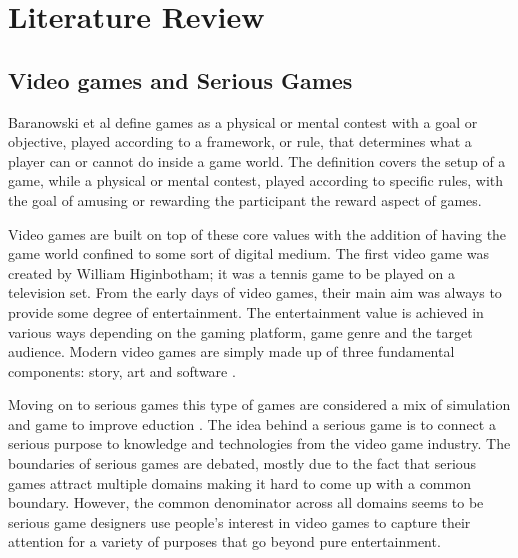 \section{Literature Review}

\subsection{Video games and Serious Games}

Baranowski et al \cite{yuserious} define games as a physical or mental contest with a goal or objective, played according to a framework, or rule, that determines what a player can or cannot do inside a game world. The definition covers the setup of a game, while a physical or mental contest, played according to specific rules, with the goal of amusing or rewarding the participant the reward aspect of games.

Video games are built on top of these core values with the addition of having the game world confined to some sort of digital medium. The first video game was created by William Higinbotham; it was a tennis game to be played on a television set\cite{stanton2015brief}. From the early days of video games, their main aim was always to provide some degree of entertainment. The entertainment value is achieved in various ways depending on the gaming platform, game genre and the target audience. Modern video games are simply made up of three fundamental components: story, art and software \cite{zyda2005visual}.

Moving on to serious games this type of games are considered a mix of simulation and game to improve eduction \cite{abt1970}. The idea behind a serious game is to connect a serious purpose to knowledge and technologies from the video game industry\cite{michael2005serious}. The boundaries of serious games are debated, mostly due to the fact that serious games attract multiple domains making it hard to come up with a common boundary. However, the common denominator across all domains seems to be serious game designers use people's interest in video games to capture their attention for a variety of purposes that go beyond pure entertainment\cite{djaouti2011classifying}.

